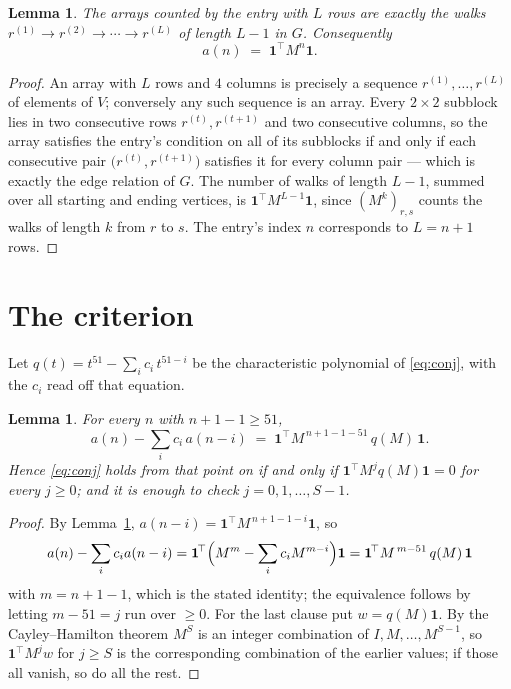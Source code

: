 \documentclass[11pt,a4paper]{article}
\theoremstyle{plain}
\newtheorem{lemma}[theorem]{Lemma}
\theoremstyle{definition}
\begin{document}
\begin{lemma}\label{lem:walk}
The arrays counted by the entry with $L$ rows are exactly the walks
$r^{(1)}\to r^{(2)}\to\cdots\to r^{(L)}$ of length $L-1$ in $G$. Consequently
\[
a(n)\;=\;\mathbf{1}^{\!\top}M^{n}\mathbf{1} .
\]
\end{lemma}

\begin{proof}
An array with $L$ rows and $4$ columns is precisely a sequence
$r^{(1)},\dots,r^{(L)}$ of elements of $V$; conversely any such sequence is an array.
Every $2\times2$ subblock lies in two consecutive rows $r^{(t)},r^{(t+1)}$ and two
consecutive columns, so the array satisfies the entry's condition on all of its subblocks
if and only if each consecutive pair $\bigl(r^{(t)},r^{(t+1)}\bigr)$ satisfies it for
every column pair --- which is exactly the edge relation of $G$. The number of walks of
length $L-1$, summed over all starting and ending vertices, is
$\mathbf{1}^{\!\top}M^{L-1}\mathbf{1}$, since $(M^{k})_{r,s}$ counts the walks of
length $k$ from $r$ to $s$. The entry's index $n$ corresponds to $L=n+1$ rows.
\end{proof}

\section{The criterion}

Let $q(t)=t^{51}-\sum_i c_i\,t^{51-i}$ be the characteristic polynomial of
\eqref{eq:conj}, with the $c_i$ read off that equation.

\begin{lemma}\label{lem:crit}
For every $n$ with $n+1-1\ge51$,
\[
a(n)-\sum_i c_i\,a(n-i)\;=\;\mathbf{1}^{\!\top}M^{\,n+1-1-51}\,q(M)\,\mathbf{1} .
\]
Hence \eqref{eq:conj} holds from that point on if and only if
$\mathbf{1}^{\!\top}M^{j}q(M)\mathbf{1}=0$ for every $j\ge0$; and it is enough to check
$j=0,1,\dots,S-1$.
\end{lemma}

\begin{proof}
By Lemma~\ref{lem:walk}, $a(n-i)=\mathbf{1}^{\!\top}M^{\,n+1-1-i}\mathbf{1}$, so
\[
a(n)-\sum_i c_i a(n-i)
=\mathbf{1}^{\!\top}\Bigl(M^{m}-\sum_i c_i M^{m-i}\Bigr)\mathbf{1}
=\mathbf{1}^{\!\top}M^{\,m-51}\,q(M)\,\mathbf{1}
\]
with $m=n+1-1$, which is the stated identity; the equivalence follows by letting
$m-51=j$ run over $\ge0$. For the last clause put $w=q(M)\mathbf{1}$. By the
Cayley--Hamilton theorem $M^{S}$ is an integer combination of $I,M,\dots,M^{S-1}$, so
$\mathbf{1}^{\!\top}M^{j}w$ for $j\ge S$ is the corresponding combination of the earlier
values; if those all vanish, so do all the rest.
\end{proof}
\end{document}
